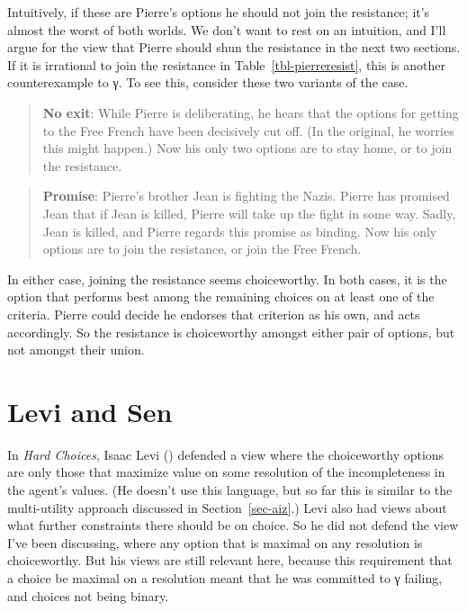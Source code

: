\documentclass[
  11pt,
  letterpaper,
  DIV=11,
  numbers=noendperiod,
  twoside]{scrartcl}
\begin{document}
Intuitively, if these are Pierre's options he should not join the
resistance; it's almost the worst of both worlds. We don't want to rest
on an intuition, and I'll argue for the view that Pierre should shun the
resistance in the next two sections. If it is irrational to join the
resistance in Table~\ref{tbl-pierreresist}, this is another
counterexample to γ. To see this, consider these two variants of the
case.

\begin{quote}
\textbf{No exit}: While Pierre is deliberating, he hears that the
options for getting to the Free French have been decisively cut off. (In
the original, he worries this might happen.) Now his only two options
are to stay home, or to join the resistance.
\end{quote}

\begin{quote}
\textbf{Promise}: Pierre's brother Jean is fighting the Nazis. Pierre
has promised Jean that if Jean is killed, Pierre will take up the fight
in some way. Sadly, Jean is killed, and Pierre regards this promise as
binding. Now his only options are to join the resistance, or join the
Free French.
\end{quote}

In either case, joining the resistance seems choiceworthy. In both
cases, it is the option that performs best among the remaining choices
on at least one of the criteria. Pierre could decide he endorses that
criterion as his own, and acts accordingly. So the resistance is
choiceworthy amongst either pair of options, but not amongst their
union.

\section{Levi and Sen}\label{sec-levisen}

In \emph{Hard Choices}, Isaac Levi ()
defended a view where the choiceworthy options are only those that
maximize value on some resolution of the incompleteness in the agent's
values. (He doesn't use this language, but so far this is similar to the
multi-utility approach discussed in Section~\ref{sec-aiz}.) Levi also
had views about what further constraints there should be on choice. So
he did not defend the view I've been discussing, where any option that
is maximal on any resolution is choiceworthy. But his views are still
relevant here, because this requirement that a choice be maximal on a
resolution meant that he was committed to γ failing, and choices not
being binary.
\end{document}
